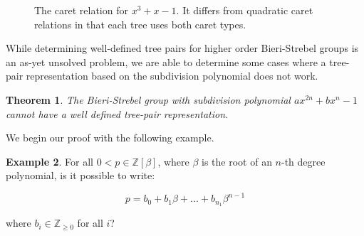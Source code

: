 \documentclass[
11pt, %
english, %
singlespacing, %
parskip, %
headsepline, %
]{amsart} %
\newtheorem{theorem}{Theorem}[section]
\theoremstyle{definition}
\newtheorem{example}[theorem]{Example}
\begin{document}
\begin{center}
\begin{figure}[H]
\centering
{}
\caption{The caret relation for $x^3+x-1$. It differs from quadratic caret relations in that each tree uses both caret types.} 
\end{figure}
\end{center}

While determining well-defined tree pairs for higher order Bieri-Strebel groups is an as-yet unsolved problem, we are able to determine some cases where a tree-pair representation based on the subdivision polynomial does not work. 

\begin{theorem}\label{roothm}
The Bieri-Strebel group with subdivision polynomial $ax^{2n}+bx^n-1$ cannot have a well defined tree-pair representation.
\end{theorem}

We begin our proof with the following example.


\begin{example} \label{rootfind}
For all $0<p \in \mathbb{Z}[\beta]$, where $\beta$ is the root of an $n$-th degree polynomial, is it possible to write:

$$
p = b_0 + b_1 \beta +...+b_{n_1} \beta^{n-1}
$$

where $b_i \in \mathbb{Z}_{\geq 0}$ for all $i$?
\end{example}
\end{document}
